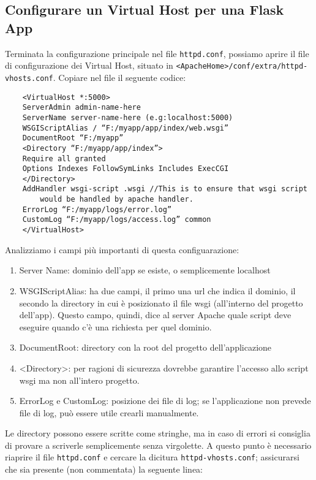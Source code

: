 \subsection*{Configurare un Virtual Host per una Flask App}

Terminata la configurazione principale nel file \verb|httpd.conf|, possiamo aprire il file di configurazione dei Virtual Host, situato in 
\newline
\verb|<ApacheHome>/conf/extra/httpd-vhosts.conf|. Copiare nel file il seguente codice:

\begin{verbatim}
    <VirtualHost *:5000>
    ServerAdmin admin-name-here
    ServerName server-name-here (e.g:localhost:5000)
    WSGIScriptAlias / “F:/myapp/app/index/web.wsgi”
    DocumentRoot “F:/myapp”
    <Directory “F:/myapp/app/index”>
    Require all granted
    Options Indexes FollowSymLinks Includes ExecCGI
    </Directory>
    AddHandler wsgi-script .wsgi //This is to ensure that wsgi script 
        would be handled by apache handler.
    ErrorLog “F:/myapp/logs/error.log”
    CustomLog “F:/myapp/logs/access.log” common
    </VirtualHost>
\end{verbatim}

Analizziamo i campi più importanti di questa configuarazione:
\begin{enumerate}
    \item Server Name: dominio dell'app se esiste, o semplicemente localhost
    \item WSGIScriptAlias: ha due campi, il primo una url che indica il dominio, il secondo la directory in cui è posizionato il file wsgi (all'interno del progetto dell'app). Questo campo, quindi, dice al server Apache quale script deve eseguire quando c’è una richiesta per quel dominio.
    \item DocumentRoot: directory con la root del progetto dell'applicazione
    \item \textless{}Directory\textgreater{}: per ragioni di sicurezza dovrebbe garantire l’accesso allo script wsgi ma non all'intero progetto.
    \item ErrorLog e CustomLog: posizione dei file di log; se l’applicazione non prevede file di log, può essere utile crearli manualmente.
\end{enumerate}
Le directory possono essere scritte come stringhe, ma in caso di errori si consiglia di provare a scriverle semplicemente senza virgolette.
\newline
A questo punto è necessario riaprire il file \verb|httpd.conf| e cercare la dicitura 
\newline
\verb|httpd-vhosts.conf|; assicurarsi che sia presente (non commentata) la seguente linea:

